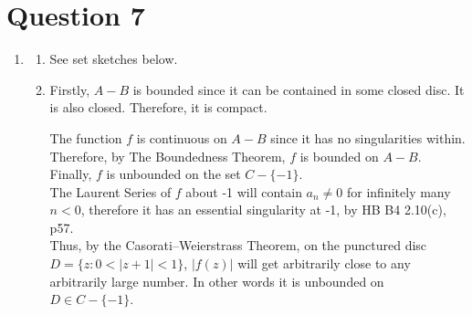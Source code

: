 \section{Question 7}
\begin{enumerate}[label=(\alph*)]
\item
    \begin{enumerate}[label=(\roman*)]
    \item See set sketches below.
    \vvs \\
    \begin{figure}[p]
\centering
    
\end{figure}
    \item 
    Firstly, $A-B$ is bounded since it can be contained in some closed disc. It is also closed. Therefore, it is compact.
    
    The function $f$ is continuous on $A-B$ since it has no singularities within. Therefore, by The Boundedness Theorem, $f$ is bounded on $A-B$.
    \vs \\
    Finally, $f$ is unbounded on the set $C - \{-1\}$.
    \vs \\
    The Laurent Series of $f$ about -1 will contain $a_n \neq 0$ for infinitely many $n<0$, therefore it has an essential singularity at -1, by HB B4 2.10(c), p57. 
    \vs \\
    Thus, by the Casorati–Weierstrass Theorem, on the punctured disc $ D =  \{z: 0 < |z+1| < 1 \} $, $ |f(z)| $ will get arbitrarily close to any arbitrarily large number. In other words it is unbounded on $ D \in C - \{  -1 \} $.
    




\end{enumerate}
\end{enumerate}
